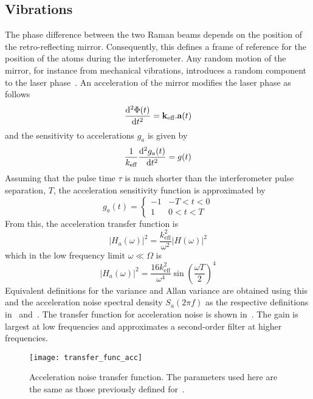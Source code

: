 \subsection{Vibrations}\label{subsec:vibration_noise}
The phase difference between the two Raman beams depends on the
position of the retro-reflecting mirror. Consequently, this defines a frame of
reference for the position of the atoms during the interferometer. Any
random motion of the mirror, for instance from mechanical vibrations,
introduces a random component to the laser phase~\cite{Vigue2006}. An acceleration of
the mirror modifies the laser phase as follows
\begin{equation}
  \frac{\mathrm{d}^2 \Phi(t)}{\mathrm{d} t^2} = {\textbf k_\textnormal{eff}}.\textbf{a}(t)
  \label{eq:phase_acc}
\end{equation}
and the sensitivity to accelerations \(g_a\) is given by
\begin{equation}
  \frac{1}{k_\text{eff}} \frac{\mathrm{d}^2 g_a(t)}{\mathrm{d} t^2} =
  g(t) \\
  \label{eq:acc_sens}
\end{equation}
Assuming that the pulse time \(\tau\) is much shorter than the
interferometer pulse separation, \(T\), the acceleration sensitivity
function is approximated by
\begin{equation}
  g_a(t) = \begin{cases}
 -1 & - T < t < 0\\
 1 & 0 < t < T
  \end{cases}
  \label{eq:acc_sens_approx}
\end{equation}
From this, the acceleration transfer function is
\begin{equation}
  |H_a(\omega)|^2 = \frac{k_\text{eff}^2}{\omega^2}|H(\omega)|^2 
  \label{eq:acc_transfer}
\end{equation}
which in the low frequency limit \(\omega \ll \Omega\) is
\begin{equation}
  |H_a(\omega)|^2 = \frac{16 k_\text{eff}^2}{\omega^4}
  \sin\left(\frac{\omega T}{2}\right)^4
  \label{eq:acc_tf_low}
\end{equation}
Equivalent definitions for the variance and Allan variance are
obtained using this and the acceleration noise spectral density
\(S_a(2\pi f)\) as the respective definitions
in~
and~. The transfer function for
acceleration noise is shown in~. The
gain is largest at low frequencies and approximates a second-order
filter at higher frequencies.
\begin{figure}[htpb]
  \centering
  \texttt{[image: transfer\_func\_acc]}
  \caption[Acceleration noise transfer function.]{Acceleration noise
  transfer function. The parameters used here are the same as those
previously defined for~.}
  \label{fig:transfer_func_acc}
\end{figure}
